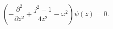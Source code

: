 \begin{equation} \label{bessel-ode}
\left( -\frac{\partial^2}{\partial z^2} 
+ \frac{j^2 - 1}{4z^2} - \omega^2 \right) \psi(z) = 0.
\end{equation}

